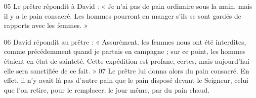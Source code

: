 

05 Le prêtre répondit à David : « Je n’ai pas de pain ordinaire sous la main, mais il y a le pain consacré. Les hommes pourront en manger s’ils se sont gardés de rapports avec les femmes. »

06 David répondit au prêtre : « Assurément, les femmes nous ont été interdites, comme précédemment quand je partais en campagne ; sur ce point, les hommes étaient en état de sainteté. Cette expédition est profane, certes, mais aujourd’hui elle sera sanctifiée de ce fait. »
07 Le prêtre lui donna alors du pain consacré. En effet, il n’y avait là pas d’autre pain que le pain disposé devant le Seigneur, celui que l’on retire, pour le remplacer, le jour même, par du pain chaud.
